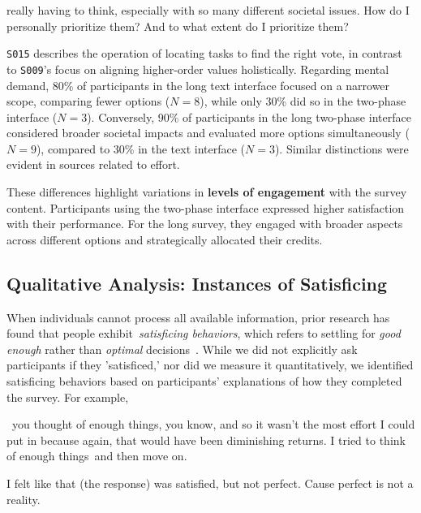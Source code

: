 \begin{displayquote}
\bracketellipsis really having to think, especially with so many different societal issues. How do I personally prioritize them? And to what extent do I prioritize them? \hfill{}
\end{displayquote}

\texttt{S015} describes the operation of locating tasks to find the right vote, in contrast to \texttt{S009}'s focus on aligning higher-order values holistically. Regarding mental demand, 80\% of participants in the long text interface focused on a narrower scope, comparing fewer options ($N=8$), while only 30\% did so in the two-phase interface ($N=3$). Conversely, 90\% of participants in the long two-phase interface considered broader societal impacts and evaluated more options simultaneously ($N=9$), compared to 30\% in the text interface ($N=3$). Similar distinctions were evident in sources related to effort.

These differences highlight variations in \textbf{levels of engagement} with the survey content. Participants using the two-phase interface expressed higher satisfaction with their performance. For the long survey, they engaged with broader aspects across different options and strategically allocated their credits.

\subsection{Qualitative Analysis: Instances of Satisficing}
\label{sec:satisficing}
When individuals cannot process all available information, prior research has found that people exhibit~\textit{satisficing behaviors}, which refers to settling for \textit{good enough} rather than \textit{optimal} decisions~\cite{gigerenzerReasoningFastFrugal1996}. While we did not explicitly ask participants if they 'satisficed,' nor did we measure it quantitatively, we identified satisficing behaviors based on participants' explanations of how they completed the survey. For example, 

\begin{displayquote}
    ~\bracketellipsis you thought of enough things, you know, and so it wasn't the most effort I could put in because again, that would have been diminishing returns. I tried to think of enough things~\bracketellipsis and then move on.~\bracketellipsis  \hfill{}
    
    I felt like that (the response) was satisfied, but not perfect. Cause perfect is not a reality. \hfill{}
\end{displayquote}

